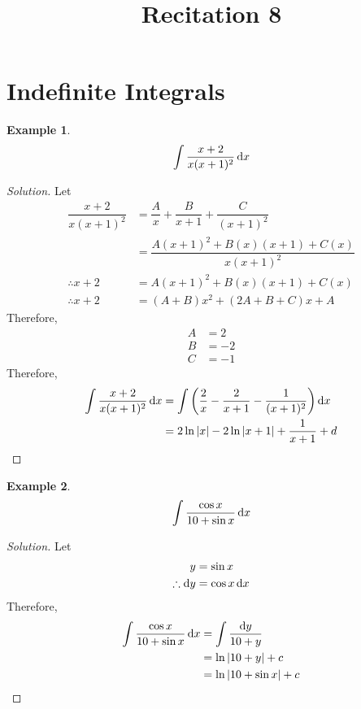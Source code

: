 \documentclass[fleqn, 12pt]{article}
\title{Recitation 8}
\author{}
\date{\formatdate{17}{12}{2014}}
\theoremstyle{definition}
\newtheorem{example}{Example}
\theoremstyle{theorem}
\newenvironment{solution}
{\begin{proof}[Solution]\let\qed\relax}
	{\end{proof}}
\begin{document}
\maketitle

\tableofcontents

\newpage
\section{Indefinite Integrals}

\begin{example}
	\begin{equation*}
		\int \dfrac{x + 2}{x (x + 1)^2} \dif x
	\end{equation*}
\end{example}

\begin{solution}
	Let
	\begin{align*}
		\dfrac{x + 2}{x (x + 1)^2} &= \dfrac{A}{x} + \dfrac{B}{x + 1} + \dfrac{C}{(x + 1)^2}\\
		&= \dfrac{A(x+1)^2 + B(x)(x+1) + C(x)}{x(x+1)^2}\\
		\therefore x + 2 &= A(x+1)^2 + B(x)(x+1) + C(x)\\
		\therefore x + 2 &= (A + B) x^2 + (2A + B + C) x + A
	\end{align*}
	Therefore,
	\begin{align*}
		A &= 2\\
		B &= -2\\
		C &= -1
	\end{align*}
	Therefore,
	\begin{align*}
		\int \dfrac{x + 2}{x (x + 1)^2} \dif x &= \int \left( \dfrac{2}{x} - \dfrac{2}{x + 1} - \dfrac{1}{(x + 1)^2} \right) \dif x\\
		&= 2 \ln |x| - 2 \ln |x + 1| + \dfrac{1}{x + 1} + d
	\end{align*}
\end{solution}

\begin{example}
	\begin{equation*}
		\int \dfrac{\cos x}{10 + \sin x} \dif x
	\end{equation*}
\end{example}

\begin{solution}
	Let
	\begin{align*}
		y &= \sin x\\
		\therefore \dif y &= \cos x \dif x
	\end{align*}
	Therefore,
	\begin{align*}
		\int \dfrac{\cos x}{10 + \sin x} \dif x &= \int \dfrac{\dif y}{10 + y}\\
		&= \ln |10 + y| + c\\
		&= \ln |10 + \sin x| + c
	\end{align*}
\end{solution}
\end{document}
